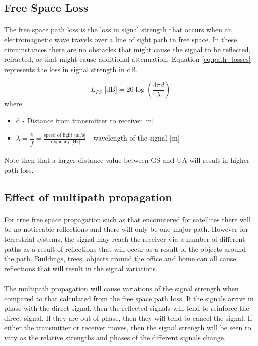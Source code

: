\subsection{Free Space Loss}\label{subsec:path_loss}
\paragraph{}
The free space path loss is the loss in signal strength that occurs when an electromagnetic wave travels over a line of sight path in free space. In these circumstances there are no obstacles that might cause the signal to be reflected, refracted, or that might cause additional attenuation. Equation \ref{eq:path_losses} represents the loss in signal strength in dB.

\begin{equation}\label{eq:path_losses}
	L_{FS}\text{ [dB]} = 20\log\left (\frac{4\pi d}{\lambda} \right)
\end{equation}
where
\begin{itemize}
	\item d - Distance from transmitter to receiver [m]
	\item $\lambda  = \dfrac{c}{f} = \frac{\text{speed of light [m/s]}}{\text{frequency [Hz]}}$ - wavelength of the signal [m]
\end{itemize}

\paragraph{} Note then that a larger distance value between GS and UA will result in higher path loss.

\subsection*{Effect of multipath propagation}
\paragraph{}For true free space propagation such as that encountered for satellites there will be no noticeable reflections and there will only be one major path. However for terrestrial systems, the signal may reach the receiver via a number of different paths as a result of reflections that will occur as a result of the objects around the path. Buildings, trees, objects around the office and home can all cause reflections that will result in the signal variations.

\paragraph{}The multipath propagation will cause variations of the signal strength when compared to that calculated from the free space path loss. If the signals arrive in phase with the direct signal, then the reflected signals will tend to reinforce the direct signal. If they are out of phase, then they will tend to cancel the signal. If either the transmitter or receiver moves, then the signal strength will be seen to vary as the relative strengths and phases of the different signals change.